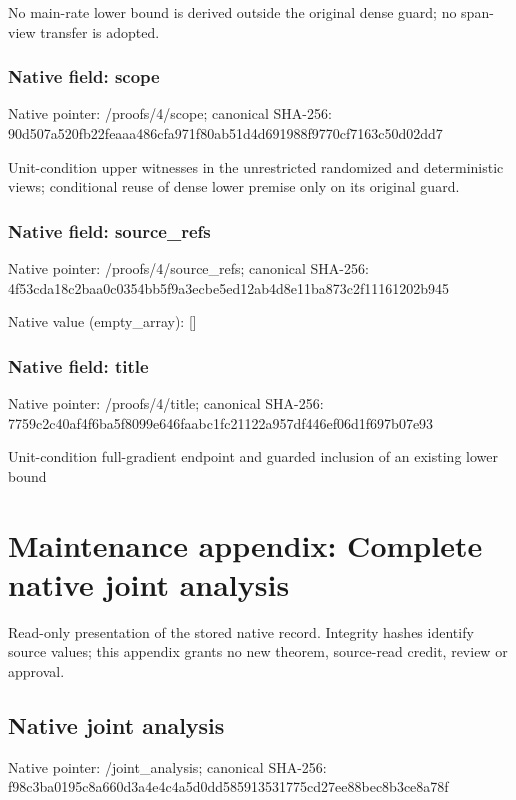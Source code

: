\documentclass[10pt,a4paper]{article}
\begin{document}
\begingroup\raggedright\sloppy No main-rate lower bound is derived outside the original dense guard;\allowbreak{} no span-view transfer is adopted.\par\endgroup

\subsubsection{Native field: scope}
Native pointer: /proofs/4/scope; canonical SHA-256: 90d507a520fb22feaaa486cfa971f80ab51d4d691988f9770cf7163c50d02dd7

\begingroup\raggedright\sloppy Unit-condition upper witnesses in the unrestricted randomized and deterministic views;\allowbreak{} conditional reuse of dense lower premise only on its original guard.\par\endgroup

\subsubsection{Native field: source\_\allowbreak{}refs}
Native pointer: /proofs/4/source\_\allowbreak{}refs; canonical SHA-256: 4f53cda18c2baa0c0354bb5f9a3ecbe5ed12ab4d8e11ba873c2f11161202b945

Native value (empty\_\allowbreak{}array): []

\subsubsection{Native field: title}
Native pointer: /proofs/4/title; canonical SHA-256: 7759c2c40af4f6ba5f8099e646faabc1fc21122a957df446ef06d1f697b07e93

\begingroup\raggedright\sloppy Unit-condition full-gradient endpoint and guarded inclusion of an existing lower bound\par\endgroup

\section{Maintenance appendix: Complete native joint analysis}
Read-only presentation of the stored native record. Integrity hashes identify source values; this appendix grants no new theorem, source-read credit, review or approval.

\subsection{Native joint analysis}
Native pointer: /joint\_\allowbreak{}analysis; canonical SHA-256: f98c3ba0195c8a660d3a4e4c4a5d0dd585913531775cd27ee88bec8b3ce8a78f
\end{document}
